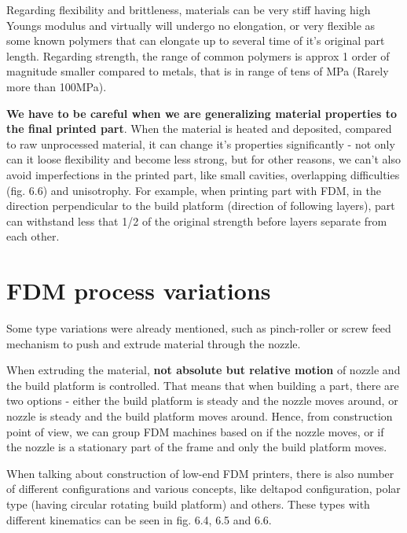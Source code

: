 \documentclass[a4paper, twoside, 11pt]{report}
\begin{document}
	Regarding flexibility and brittleness, materials can be very stiff having high Youngs modulus and virtually will undergo no elongation, or very flexible as some known polymers that can elongate up to several time of it's original part length. Regarding strength, the range of common polymers is approx 1 order of magnitude smaller compared to metals, that is in range of tens of MPa (Rarely more than 100MPa).

\textbf{We have to be careful when we are generalizing material properties to the final printed part}. When the material is heated and deposited, compared to raw unprocessed material, it can change it's properties significantly - not only can it loose flexibility and become less strong, but for other reasons, we can't also avoid imperfections in the printed part, like small cavities, overlapping difficulties (fig. 6.6) and unisotrophy. For example, when printing part with FDM, in the direction perpendicular to the build platform (direction of following layers), part can withstand less that 1/2 of the original strength before layers separate from each other.

\section{FDM process variations}
Some type variations were already mentioned, such as pinch-roller or screw feed mechanism to push and extrude material through the nozzle.

	When extruding the material, \textbf{not absolute but relative motion} of nozzle and the build platform is controlled. That means that when building a part, there are two options - either the build platform is steady and the nozzle moves around, or nozzle is steady and the build platform moves around. Hence, from construction point of view, we can group FDM machines based on if the nozzle moves, or if the nozzle is a stationary part of the frame and only the build platform moves.
	
	When talking about construction of low-end FDM printers, there is also number of different configurations and various concepts, like deltapod configuration, polar type (having circular rotating build platform) and others. These types with different kinematics can be seen in fig. 6.4, 6.5 and 6.6.
\end{document}
